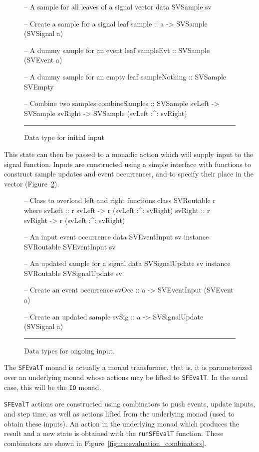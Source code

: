 \documentclass[draft]{llncs}
\begin{document}
\begin{figure}
\begin{code}
-- A sample for all leaves of a signal vector
data SVSample sv

-- Create a sample for a signal leaf
sample          :: a -> SVSample (SVSignal a)

-- A dummy sample for an event leaf
sampleEvt       :: SVSample (SVEvent a)

-- A dummy sample for an empty leaf
sampleNothing   :: SVSample SVEmpty

-- Combine two samples
combineSamples  ::    SVSample svLeft
                   -> SVSample svRight
                   -> SVSample (svLeft :^: svRight)
\end{code}
\hrule
\caption{Data type for initial input}
\label{figure:initial_input}
\end{figure}

This state can then be passed to a monadic action which will supply input to
the signal function. Inputs are constructed using a simple interface with
functions to construct sample updates and event occurrences, and to specify
their place in the vector (Figure~\ref{figure:ongoing_input}).

\begin{figure}
\begin{code}
-- Class to overload left and right functions
class SVRoutable r where
  svLeft          :: r svLeft -> r (svLeft :^: svRight)
  svRight         :: r svRight -> r (svLeft :^: svRight)

-- An input event occurrence
data SVEventInput sv
instance SVRoutable SVEventInput sv

-- An updated sample for a signal
data SVSignalUpdate sv
instance SVRoutable SVSignalUpdate sv

-- Create an event occurrence
svOcc           :: a -> SVEventInput (SVEvent a)

-- Create an updated sample
svSig           :: a -> SVSignalUpdate (SVSignal a)
\end{code}
\hrule
\caption{Data types for ongoing input.}
\label{figure:ongoing_input}
\end{figure}

The {\tt SFEvalT} monad is actually a monad transformer, that is, it is
parameterized over an underlying monad whose actions may be lifted to
{\tt SFEvalT}. In the usual case, this will be the {\tt IO} monad.

{\tt SFEvalT} actions are constructed using combinators to push events,
update inputs, and step time, as well as actions lifted from the underlying
monad (used to obtain these inputs). An action in the underlying monad
which produces the result and a new state is obtained with the {\tt runSFEvalT}
function. These combinators are shown in Figure~\ref{figure:evaluation_combinators}.
\end{document}
